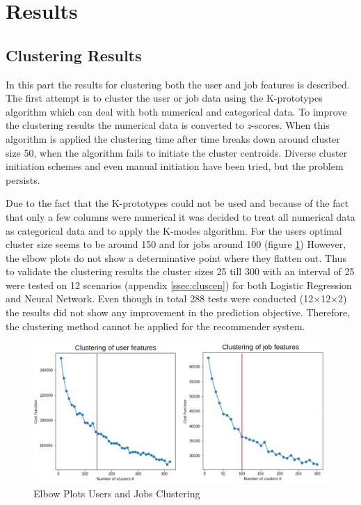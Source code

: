 \section{Results}
\label{sec:rslts}


\subsection{Clustering Results}
\label{ssec:clures}
In this part the results for clustering both the user and job features is described.
The first attempt is to cluster the user or job data using the K-prototypes algorithm which can deal with both numerical and categorical data. 
To improve the clustering results the numerical data is converted to \textit{z}-scores.
When this algorithm is applied the clustering time after time breaks down around cluster size 50, when the algorithm fails to initiate the cluster centroids. 
Diverse cluster initiation schemes and even manual initiation have been tried, but the problem persists. 

Due to the fact that the K-prototypes could not be used and because of the fact that only a few columns were numerical it was decided to treat all numerical data as categorical data and to apply the K-modes algorithm.
For the users optimal cluster size seems to be around 150 and for jobs around 100 (figure \ref{fig:eb})
However, the elbow plots do not show a determinative point where they flatten out.
Thus to validate the clustering results the cluster sizes 25 till 300 with an interval of 25 were tested on 12 scenarios (appendix \ref{ssec:cluscen}) for both Logistic Regression and Neural Network.
Even though in total 288 tests were  conducted (12$\times$12$\times$2) the results did not show any improvement in the prediction objective. 
Therefore, the clustering method cannot be applied for the recommender system.

\begin{figure}[H]
    \centering
    \includegraphics[width=\linewidth]{ThesisTemplate/Images/Clustering.png}
    \caption{\label{fig:eb} Elbow Plots Users and Jobs Clustering}
\end{figure}


